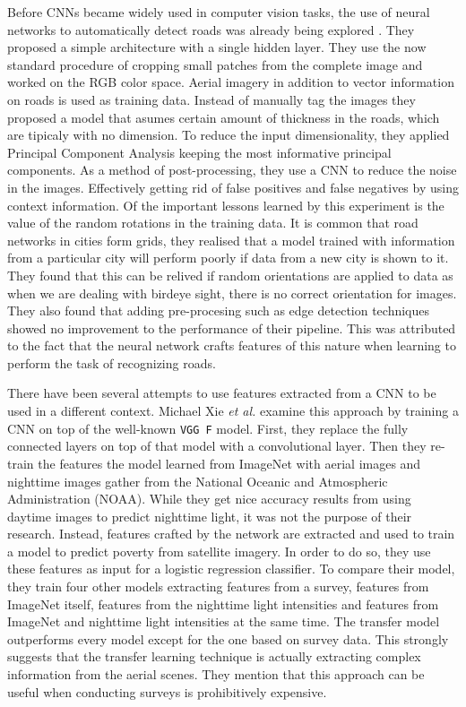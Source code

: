 Before CNNs became widely used in computer vision tasks, the use of neural networks to automatically detect roads was already being explored \cite{Mnih:2010:LDR:1888212.1888230}. They proposed a simple architecture with a single hidden layer. They use the now standard procedure of cropping small patches from the complete image and worked on the RGB color space. Aerial imagery in addition to vector information on roads is used as training data. Instead of manually tag the images they proposed a model that asumes certain amount of thickness in the roads, which are tipicaly with no dimension. To reduce the input dimensionality, they applied Principal Component Analysis keeping the most informative principal components. As a method of post-processing, they use a CNN to reduce the noise in the images. Effectively getting rid of false positives and false negatives by using context information. Of the important lessons learned by this experiment is the value of the random rotations in the training data. It is common that road networks in cities form grids, they realised that a model trained with information from a particular city will perform poorly if data from a new city is shown to it. They found that this can be relived if random orientations are applied to data as when we are dealing with birdeye sight, there is no correct orientation for images. They also found that adding pre-procesing such as edge detection techniques showed no improvement to the performance of their pipeline. This was attributed to the fact that the neural network crafts features of this nature when learning to perform the task of recognizing roads.

There have been several attempts to use features extracted from a CNN to be used in a different context. Michael Xie \textit{et al.} \cite{DBLP:journals/corr/XieJBLE15} examine this approach by training a CNN on top of the well-known \texttt{VGG F} model. First, they replace the fully connected layers on top of that model with a convolutional layer. Then they re-train the features the model learned from ImageNet with aerial images and nighttime images gather from the National Oceanic and Atmospheric Administration (NOAA). While they get nice accuracy results from using daytime images to predict nighttime light, it was not the purpose of their research. Instead, features crafted by the network are extracted and used to train a model to predict poverty from satellite imagery. In order to do so, they use these features as input for a logistic regression classifier. To compare their model, they train four other models extracting features from a survey, features from ImageNet itself, features from the nighttime light intensities and features from ImageNet and nighttime light intensities at the same time. The transfer model outperforms every model except for the one based on survey data. This strongly suggests that the transfer learning technique is actually extracting complex information from the aerial scenes. They mention that this approach can be useful when conducting surveys is prohibitively expensive.


